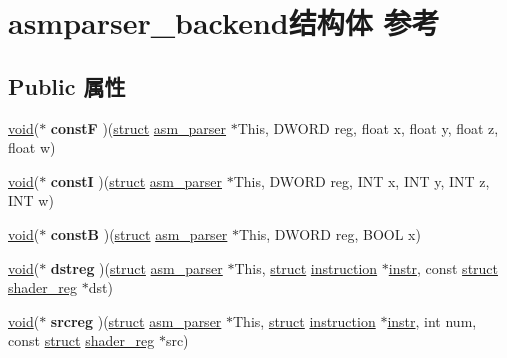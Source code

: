 \hypertarget{structasmparser__backend}{}\section{asmparser\+\_\+backend结构体 参考}
\label{structasmparser__backend}
\subsection*{Public 属性}
\begin{DoxyCompactItemize}
\item 
\mbox{\label{structasmparser__backend_aa0eba2d17603ebdd995d7d3055798870}} 
\hyperlink{interfacevoid}{void}($\ast$ {\bfseries constF} )(\hyperlink{interfacestruct}{struct} \hyperlink{structasm__parser}{asm\+\_\+parser} $\ast$This, D\+W\+O\+RD reg, float x, float y, float z, float w)
\item 
\mbox{\label{structasmparser__backend_ad2d332490e4dd1ad556f0aee7079f047}} 
\hyperlink{interfacevoid}{void}($\ast$ {\bfseries constI} )(\hyperlink{interfacestruct}{struct} \hyperlink{structasm__parser}{asm\+\_\+parser} $\ast$This, D\+W\+O\+RD reg, I\+NT x, I\+NT y, I\+NT z, I\+NT w)
\item 
\mbox{\label{structasmparser__backend_a499779faed59dadc0d0ebda530a0d813}} 
\hyperlink{interfacevoid}{void}($\ast$ {\bfseries constB} )(\hyperlink{interfacestruct}{struct} \hyperlink{structasm__parser}{asm\+\_\+parser} $\ast$This, D\+W\+O\+RD reg, B\+O\+OL x)
\item 
\mbox{\label{structasmparser__backend_ad769a552ff47febae7205f2b2a2b258c}} 
\hyperlink{interfacevoid}{void}($\ast$ {\bfseries dstreg} )(\hyperlink{interfacestruct}{struct} \hyperlink{structasm__parser}{asm\+\_\+parser} $\ast$This, \hyperlink{interfacestruct}{struct} \hyperlink{structinstruction}{instruction} $\ast$\hyperlink{structx86__inst}{instr}, const \hyperlink{interfacestruct}{struct} \hyperlink{structshader__reg}{shader\+\_\+reg} $\ast$dst)
\item 
\mbox{\label{structasmparser__backend_aa43f8ced0ee9de7808c521582bad7460}} 
\hyperlink{interfacevoid}{void}($\ast$ {\bfseries srcreg} )(\hyperlink{interfacestruct}{struct} \hyperlink{structasm__parser}{asm\+\_\+parser} $\ast$This, \hyperlink{interfacestruct}{struct} \hyperlink{structinstruction}{instruction} $\ast$\hyperlink{structx86__inst}{instr}, int num, const \hyperlink{interfacestruct}{struct} \hyperlink{structshader__reg}{shader\+\_\+reg} $\ast$src)

\end{DoxyCompactItemize}
